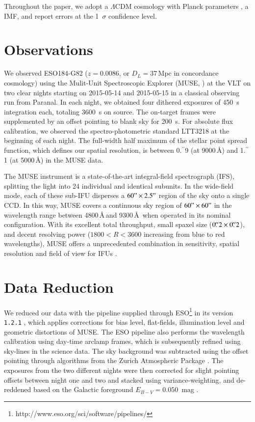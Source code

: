 \documentclass[traditabstract]{aa}
\newcommand{\farc}{\hbox{$.\!\!^{\prime\prime}$}}
\begin{document}
Throughout the paper, we adopt a $\Lambda$CDM cosmology with Planck parameters \citep{2014A&A...571A..16P}, a \citet{2003PASP..115..763C} IMF, and report errors at the 1~$\sigma$ confidence level.

\section{Observations}

We observed ESO184-G82 ($z=0.0086$, or $D_L=37$\,Mpc in concordance cosmology) using the Mulit-Unit Spectroscopic Explorer (MUSE, \citealp{2010SPIE.7735E..08B}) at the VLT on two clear nights starting on 2015-05-14 and 2015-05-15 in a classical observing run from Paranal. In each night, we obtained four dithered exposures of 450~s integration each, totaling 3600~s on source. The on-target frames were supplemented by an offset pointing to blank sky for 200~s. For absolute flux calibration, we observed the spectro-photometric standard LTT3218 at the beginning of each night. The full-width half maximum of the stellar point spread function, which defines our spatial resolution, is between 0\farc{9} (at 9000\,\AA) and 1\farc{1} (at 5000\,\AA) in the MUSE data.

The MUSE instrument is a state-of-the-art integral-field spectrograph (IFS), splitting the light into 24 individual and identical subunits. In the wide-field mode, each of these sub-IFU disperses a $60"\times 2.5"$ region of the sky onto a single CCD. In this way, MUSE covers a continuous sky region of $60"\times 60"$ in the wavelength range between 4800\,\AA\,and 9300\,\AA\, when operated in its nominal configuration. With its excellent total throughput, small spaxel size ($0\farc{2} \times 0\farc{2}$), and decent resolving power ($1800 < R < 3600$ increasing from blue to red wavelengths), MUSE offers a unprecedented combination in sensitivity, spatial resolution and field of view for IFUs \citep{2010SPIE.7735E..08B}.

\section{Data Reduction}

We reduced our data with the pipeline supplied through ESO\footnote{http://www.eso.org/sci/software/pipelines/} in its version \texttt{1.2.1} \citep{2014ASPC..485..451W}, which applies corrections for bias level, flat-fields, illumination level and geometric distortions of MUSE. The ESO pipeline also performs the wavelength calibration using day-time arclamp frames, which is subsequently refined using sky-lines in the science data. The sky background was subtracted using the offset pointing through algorithms from the Zurich Atmospheric Package \citep{2016MNRAS.458.3210S}. The exposures from the two different nights were then corrected for slight pointing offsets between night one and two and stacked using variance-weighting, and de-reddened based on the Galactic foreground $E_{B-V}=0.050$~mag \citep{2011ApJ...737..103S}. 
\end{document}
